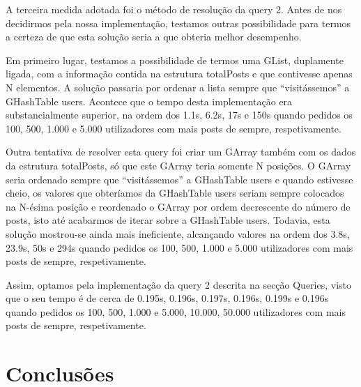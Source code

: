 \documentclass[a4paper]{article}
\begin{document}
A terceira medida adotada foi o método de resolução da query 2. Antes de nos decidirmos
pela nossa implementação, testamos outras possibilidade para termos a certeza de que
esta solução seria a que obteria melhor desempenho.\par
Em primeiro lugar, testamos a possibilidade de termos uma GList, duplamente ligada,
com a informação contida na estrutura totalPosts e que contivesse apenas N elementos.
A solução passaria por ordenar a lista sempre que ``visitássemos'' a GHashTable users.
Acontece que o tempo desta implementação era substancialmente superior, na ordem dos
1.1s, 6.2s, 17s e 150s quando pedidos os 100,
500, 1.000 e 5.000 utilizadores com mais posts de sempre, respetivamente. \par
Outra tentativa de resolver esta query foi criar um GArray também com os dados
da estrutura totalPosts, só que este GArray teria somente N posições. O GArray
seria ordenado sempre que ``visitássemos'' a GHashTable users e quando estivesse
cheio, os valores que obteríamos da GHashTable users seriam sempre colocados na
N-ésima posição e reordenado o GArray por ordem decrescente do número de posts,
isto até acabarmos de iterar sobre a GHashTable users. Todavia, esta solução
mostrou-se ainda mais ineficiente, alcançando valores na ordem dos 3.8s, 23.9s,
50s e 294s quando pedidos os 100, 500, 1.000 e 5.000 utilizadores com mais posts
de sempre, respetivamente. \par
Assim, optamos pela implementação da query 2 descrita na secção Queries, visto que
o seu tempo é de cerca de 0.195s, 0.196s, 0.197s, 0.196s, 0.199s e 0.196s
quando pedidos os 100, 500, 1.000 e 5.000, 10.000, 50.000 utilizadores com mais
posts de sempre, respetivamente.


\section{Conclusões}
\label{sec:conclusao}
\end{document}
